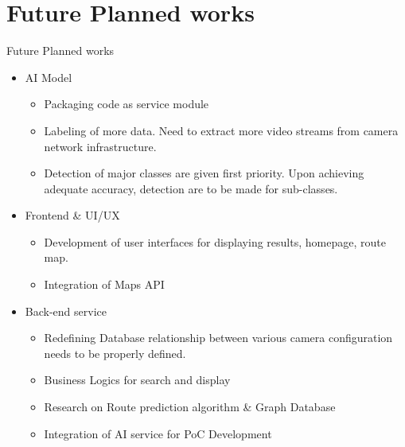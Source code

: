 \documentclass{beamer}
\begin{document}
	\section{Future Planned works}
	\begin{frame}{Future Planned works}
		\begin{itemize}
			\item AI Model \\
			\begin{itemize}
				\item Packaging code as service module
				\item Labeling of more data. Need to extract more video streams from camera network infrastructure.
				\item Detection of major classes are given first priority. Upon achieving adequate accuracy, detection are to be made for sub-classes.
			\end{itemize}
			
			\item Frontend \& UI/UX\\
			\begin{itemize}
				\item Development of user interfaces for displaying results, homepage, route map.
				\item Integration of Maps API
			\end{itemize}
			\item Back-end service\\
			\begin{itemize}
				\item Redefining Database relationship between various camera configuration needs to be properly defined.
				\item Business Logics for search and display
				\item Research on Route prediction algorithm \& Graph Database
				\item Integration of AI service for PoC Development
			\end{itemize}
		\end{itemize}
	\end{frame}
\end{document}
